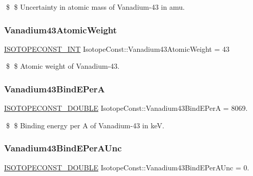 \$ \$ Uncertainty in atomic mass of Vanadium-\/43 in amu. \mbox{\label{group___isotope_const-_vanadium-_v43_ga05f43f354b55778624af871d9416fe78}} 
\subsubsection{\texorpdfstring{Vanadium43\+Atomic\+Weight}{Vanadium43AtomicWeight}}
{\footnotesize\ttfamily \mbox{\hyperlink{group___isotope_const-_macros_ga5f18360b3e99483a35c32d789e62621c}{I\+S\+O\+T\+O\+P\+E\+C\+O\+N\+S\+T\+\_\+\+I\+NT}} Isotope\+Const\+::\+Vanadium43\+Atomic\+Weight = 43}

\$ \$ Atomic weight of Vanadium-\/43. \mbox{\label{group___isotope_const-_vanadium-_v43_ga5b7fd6d78f5075cd086246c35e7e9dce}} 
\subsubsection{\texorpdfstring{Vanadium43\+Bind\+E\+PerA}{Vanadium43BindEPerA}}
{\footnotesize\ttfamily \mbox{\hyperlink{group___isotope_const-_macros_ga8f45a7272ce02c0b4c65c44636ed719a}{I\+S\+O\+T\+O\+P\+E\+C\+O\+N\+S\+T\+\_\+\+D\+O\+U\+B\+LE}} Isotope\+Const\+::\+Vanadium43\+Bind\+E\+PerA = 8069.}

\$ \$ Binding energy per A of Vanadium-\/43 in keV. \mbox{\label{group___isotope_const-_vanadium-_v43_gafc237a16503b04bd71c5363beb6d12d9}} 
\subsubsection{\texorpdfstring{Vanadium43\+Bind\+E\+Per\+A\+Unc}{Vanadium43BindEPerAUnc}}
{\footnotesize\ttfamily \mbox{\hyperlink{group___isotope_const-_macros_ga8f45a7272ce02c0b4c65c44636ed719a}{I\+S\+O\+T\+O\+P\+E\+C\+O\+N\+S\+T\+\_\+\+D\+O\+U\+B\+LE}} Isotope\+Const\+::\+Vanadium43\+Bind\+E\+Per\+A\+Unc = 0.}

